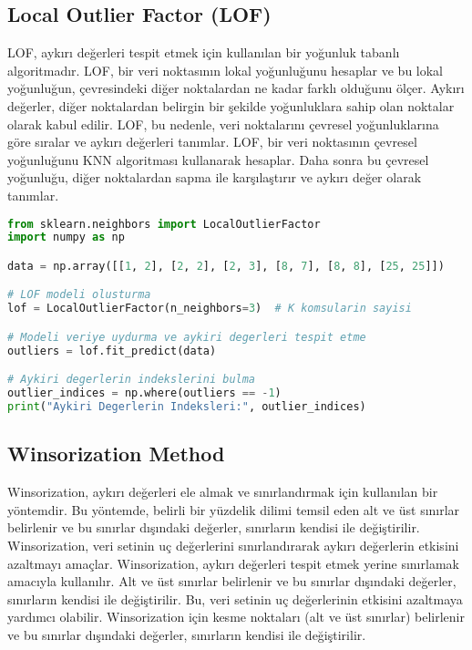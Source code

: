 \subsection{Local Outlier Factor (LOF)}
LOF, aykırı değerleri tespit etmek için kullanılan bir yoğunluk tabanlı algoritmadır. LOF, bir veri noktasının lokal yoğunluğunu hesaplar ve bu lokal yoğunluğun, çevresindeki diğer noktalardan ne kadar farklı olduğunu ölçer. Aykırı değerler, diğer noktalardan belirgin bir şekilde yoğunluklara sahip olan noktalar olarak kabul edilir. LOF, bu nedenle, veri noktalarını çevresel yoğunluklarına göre sıralar ve aykırı değerleri tanımlar. LOF, bir veri noktasının çevresel yoğunluğunu KNN algoritması kullanarak hesaplar. Daha sonra bu çevresel yoğunluğu, diğer noktalardan sapma ile karşılaştırır ve aykırı değer olarak tanımlar.

\begin{lstlisting}[language=Python]
from sklearn.neighbors import LocalOutlierFactor
import numpy as np

data = np.array([[1, 2], [2, 2], [2, 3], [8, 7], [8, 8], [25, 25]])

# LOF modeli olusturma
lof = LocalOutlierFactor(n_neighbors=3)  # K komsularin sayisi

# Modeli veriye uydurma ve aykiri degerleri tespit etme
outliers = lof.fit_predict(data)

# Aykiri degerlerin indekslerini bulma
outlier_indices = np.where(outliers == -1)
print("Aykiri Degerlerin Indeksleri:", outlier_indices)
\end{lstlisting}

\subsection{Winsorization Method}
Winsorization, aykırı değerleri ele almak ve sınırlandırmak için kullanılan bir yöntemdir. Bu yöntemde, belirli bir yüzdelik dilimi temsil eden alt ve üst sınırlar belirlenir ve bu sınırlar dışındaki değerler, sınırların kendisi ile değiştirilir. Winsorization, veri setinin uç değerlerini sınırlandırarak aykırı değerlerin etkisini azaltmayı amaçlar. Winsorization, aykırı değerleri tespit etmek yerine sınırlamak amacıyla kullanılır. Alt ve üst sınırlar belirlenir ve bu sınırlar dışındaki değerler, sınırların kendisi ile değiştirilir. Bu, veri setinin uç değerlerinin etkisini azaltmaya yardımcı olabilir. Winsorization için kesme noktaları (alt ve üst sınırlar) belirlenir ve bu sınırlar dışındaki değerler, sınırların kendisi ile değiştirilir.

